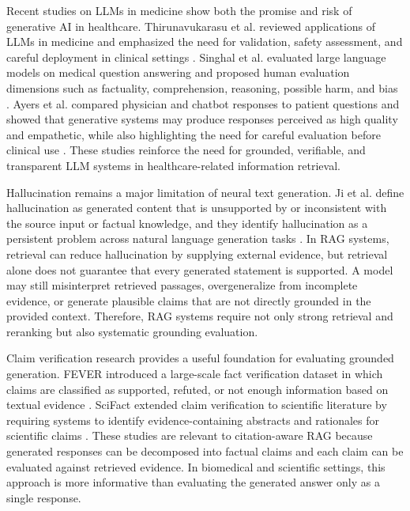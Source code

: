Recent studies on LLMs in medicine show both the promise and risk of generative AI in healthcare. Thirunavukarasu et al. reviewed applications of LLMs in medicine and emphasized the need for validation, safety assessment, and careful deployment in clinical settings \cite{thirunavukarasu2023llmmedicine}. Singhal et al. evaluated large language models on medical question answering and proposed human evaluation dimensions such as factuality, comprehension, reasoning, possible harm, and bias \cite{singhal2023medicalknowledge}. Ayers et al. compared physician and chatbot responses to patient questions and showed that generative systems may produce responses perceived as high quality and empathetic, while also highlighting the need for careful evaluation before clinical use \cite{ayers2023chatbot}. These studies reinforce the need for grounded, verifiable, and transparent LLM systems in healthcare-related information retrieval.

Hallucination remains a major limitation of neural text generation. Ji et al. define hallucination as generated content that is unsupported by or inconsistent with the source input or factual knowledge, and they identify hallucination as a persistent problem across natural language generation tasks \cite{ji2023hallucination}. In RAG systems, retrieval can reduce hallucination by supplying external evidence, but retrieval alone does not guarantee that every generated statement is supported. A model may still misinterpret retrieved passages, overgeneralize from incomplete evidence, or generate plausible claims that are not directly grounded in the provided context. Therefore, RAG systems require not only strong retrieval and reranking but also systematic grounding evaluation.

Claim verification research provides a useful foundation for evaluating grounded generation. FEVER introduced a large-scale fact verification dataset in which claims are classified as supported, refuted, or not enough information based on textual evidence \cite{thorne2018fever}. SciFact extended claim verification to scientific literature by requiring systems to identify evidence-containing abstracts and rationales for scientific claims \cite{wadden2020scifact}. These studies are relevant to citation-aware RAG because generated responses can be decomposed into factual claims and each claim can be evaluated against retrieved evidence. In biomedical and scientific settings, this approach is more informative than evaluating the generated answer only as a single response.

